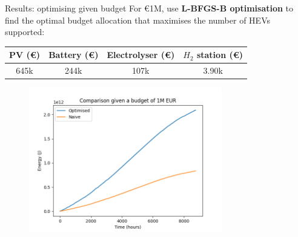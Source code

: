 \documentclass{beamer}
\begin{document}
\begin{frame}{Results: optimising given budget}
    For \euro{1M}, use \textbf{L-BFGS-B optimisation} to find the optimal budget allocation that maximises the number of HEVs supported:
    \begin{center}
        \begin{tabular}{|c|c|c|c|}
            \hline
            PV  (\euro{}) & Battery (\euro{}) & Electrolyser (\euro{}) & $H_2$ station (\euro{}) \\
            \hline
            645k          & 244k              & 107k                   & 3.90k                   \\
            \hline
        \end{tabular}
        \begin{figure}
            \centering
            \includegraphics[width=0.75\textwidth]{assets/opt_naive_cmp.png}
        \end{figure}
    \end{center}
\end{frame}
\end{document}
